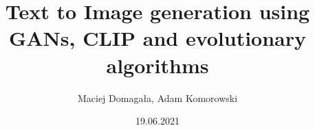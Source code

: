\documentclass[
    left=2.5cm,         %
    right=2.5cm,        %
    top=2.5cm,          %
    bottom=3cm,         %
    bindingoffset=6mm,  %
    nohyphenation=false %
]{eiti/eiti-thesis}
\begin{document}
\MasterThesis %
{}
\title{
Text to Image generation using GANs, CLIP and evolutionary algorithms
}
\author{Maciej Domagała, Adam Komorowski}
\date{19.06.2021}
\maketitle
\end{document}
